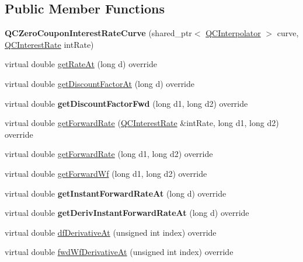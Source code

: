 \subsection*{Public Member Functions}
\begin{DoxyCompactItemize}
\item 
\hypertarget{class_q_c_zero_coupon_interest_rate_curve_a2fcb4f578bcdff82483a5aa9c7c85bb9}{{\bfseries Q\+C\+Zero\+Coupon\+Interest\+Rate\+Curve} (shared\+\_\+ptr$<$ \hyperlink{class_q_c_interpolator}{Q\+C\+Interpolator} $>$ curve, \hyperlink{class_q_c_interest_rate}{Q\+C\+Interest\+Rate} int\+Rate)}\label{class_q_c_zero_coupon_interest_rate_curve_a2fcb4f578bcdff82483a5aa9c7c85bb9}

\item 
virtual double \hyperlink{class_q_c_zero_coupon_interest_rate_curve_a7841822e2b1291753582dd4ec92269e2}{get\+Rate\+At} (long d) override
\item 
virtual double \hyperlink{class_q_c_zero_coupon_interest_rate_curve_af3a5bec430ce4a652831b47ccbcca354}{get\+Discount\+Factor\+At} (long d) override
\item 
\hypertarget{class_q_c_zero_coupon_interest_rate_curve_aa03c419f97d6551cf05b1d7a9ee6c4e9}{virtual double {\bfseries get\+Discount\+Factor\+Fwd} (long d1, long d2) override}\label{class_q_c_zero_coupon_interest_rate_curve_aa03c419f97d6551cf05b1d7a9ee6c4e9}

\item 
virtual double \hyperlink{class_q_c_zero_coupon_interest_rate_curve_a623b9416cc04c5a2a59b1279f20d3220}{get\+Forward\+Rate} (\hyperlink{class_q_c_interest_rate}{Q\+C\+Interest\+Rate} \&int\+Rate, long d1, long d2) override
\item 
virtual double \hyperlink{class_q_c_zero_coupon_interest_rate_curve_a17770bb86b17de6336be98b622ff992b}{get\+Forward\+Rate} (long d1, long d2) override
\item 
virtual double \hyperlink{class_q_c_zero_coupon_interest_rate_curve_a6da87ca82b003afbc336388c5e7b6eb6}{get\+Forward\+Wf} (long d1, long d2) override
\item 
\hypertarget{class_q_c_zero_coupon_interest_rate_curve_af5b678775f644fff398572ffd5557ec9}{virtual double {\bfseries get\+Instant\+Forward\+Rate\+At} (long d) override}\label{class_q_c_zero_coupon_interest_rate_curve_af5b678775f644fff398572ffd5557ec9}

\item 
\hypertarget{class_q_c_zero_coupon_interest_rate_curve_a97f20476b850350894241c5c3517d9ed}{virtual double {\bfseries get\+Deriv\+Instant\+Forward\+Rate\+At} (long d) override}\label{class_q_c_zero_coupon_interest_rate_curve_a97f20476b850350894241c5c3517d9ed}

\item 
virtual double \hyperlink{class_q_c_zero_coupon_interest_rate_curve_a24ae7f1a9021c24984c5c002d0df1494}{df\+Derivative\+At} (unsigned int index) override
\item 
virtual double \hyperlink{class_q_c_zero_coupon_interest_rate_curve_a043fd0690f9a941b5268e1b1f7d07ef1}{fwd\+Wf\+Derivative\+At} (unsigned int index) override
\end{DoxyCompactItemize}
